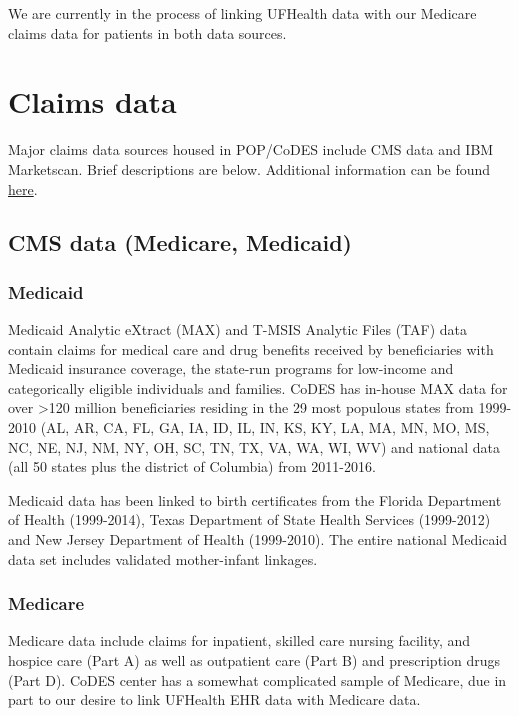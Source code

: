 \documentclass[
  letterpaper,
  DIV=11,
  numbers=noendperiod]{scrreprt}
\begin{document}
We are currently in the process of linking UFHealth data with our
Medicare claims data for patients in both data sources.

\hypertarget{claims-data}{%
\section{Claims data}\label{claims-data}}

Major claims data sources housed in POP/CoDES include CMS data and IBM
Marketscan. Brief descriptions are below. Additional information can be
found
\href{https://codes.pharmacy.ufl.edu/resources/data-sources/}{here}.

\hypertarget{cms-data-medicare-medicaid}{%
\subsection{CMS data (Medicare,
Medicaid)}\label{cms-data-medicare-medicaid}}

\hypertarget{medicaid}{%
\subsubsection{Medicaid}\label{medicaid}}

Medicaid Analytic eXtract (MAX) and T-MSIS Analytic Files (TAF) data
contain claims for medical care and drug benefits received by
beneficiaries with Medicaid insurance coverage, the state-run programs
for low-income and categorically eligible individuals and families.
CoDES has in-house MAX data for over \textgreater120 million
beneficiaries residing in the 29 most populous states from 1999-2010
(AL, AR, CA, FL, GA, IA, ID, IL, IN, KS, KY, LA, MA, MN, MO, MS, NC, NE,
NJ, NM, NY, OH, SC, TN, TX, VA, WA, WI, WV) and national data (all 50
states plus the district of Columbia) from 2011-2016.

Medicaid data has been linked to birth certificates from the Florida
Department of Health (1999-2014), Texas Department of State Health
Services (1999-2012) and New Jersey Department of Health (1999-2010).
The entire national Medicaid data set includes validated mother-infant
linkages.

\hypertarget{medicare}{%
\subsubsection{Medicare}\label{medicare}}

Medicare data include claims for inpatient, skilled care nursing
facility, and hospice care (Part A) as well as outpatient care (Part B)
and prescription drugs (Part D). CoDES center has a somewhat complicated
sample of Medicare, due in part to our desire to link UFHealth EHR data
with Medicare data.
\end{document}
